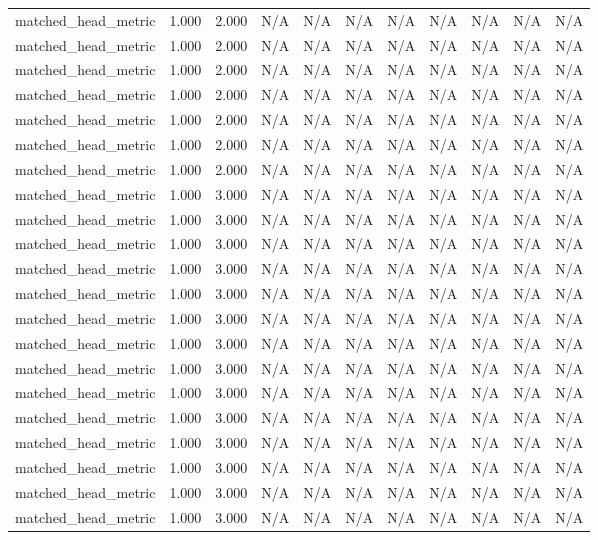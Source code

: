 \begin{table}[h!]
\begin{tabular}{lrrrrrrrrrr}
matched\_head\_metric & 1.000 & 2.000 & N/A & N/A & N/A & N/A & N/A & N/A & N/A & N/A \\
matched\_head\_metric & 1.000 & 2.000 & N/A & N/A & N/A & N/A & N/A & N/A & N/A & N/A \\
matched\_head\_metric & 1.000 & 2.000 & N/A & N/A & N/A & N/A & N/A & N/A & N/A & N/A \\
matched\_head\_metric & 1.000 & 2.000 & N/A & N/A & N/A & N/A & N/A & N/A & N/A & N/A \\
matched\_head\_metric & 1.000 & 2.000 & N/A & N/A & N/A & N/A & N/A & N/A & N/A & N/A \\
matched\_head\_metric & 1.000 & 2.000 & N/A & N/A & N/A & N/A & N/A & N/A & N/A & N/A \\
matched\_head\_metric & 1.000 & 2.000 & N/A & N/A & N/A & N/A & N/A & N/A & N/A & N/A \\
matched\_head\_metric & 1.000 & 3.000 & N/A & N/A & N/A & N/A & N/A & N/A & N/A & N/A \\
matched\_head\_metric & 1.000 & 3.000 & N/A & N/A & N/A & N/A & N/A & N/A & N/A & N/A \\
matched\_head\_metric & 1.000 & 3.000 & N/A & N/A & N/A & N/A & N/A & N/A & N/A & N/A \\
matched\_head\_metric & 1.000 & 3.000 & N/A & N/A & N/A & N/A & N/A & N/A & N/A & N/A \\
matched\_head\_metric & 1.000 & 3.000 & N/A & N/A & N/A & N/A & N/A & N/A & N/A & N/A \\
matched\_head\_metric & 1.000 & 3.000 & N/A & N/A & N/A & N/A & N/A & N/A & N/A & N/A \\
matched\_head\_metric & 1.000 & 3.000 & N/A & N/A & N/A & N/A & N/A & N/A & N/A & N/A \\
matched\_head\_metric & 1.000 & 3.000 & N/A & N/A & N/A & N/A & N/A & N/A & N/A & N/A \\
matched\_head\_metric & 1.000 & 3.000 & N/A & N/A & N/A & N/A & N/A & N/A & N/A & N/A \\
matched\_head\_metric & 1.000 & 3.000 & N/A & N/A & N/A & N/A & N/A & N/A & N/A & N/A \\
matched\_head\_metric & 1.000 & 3.000 & N/A & N/A & N/A & N/A & N/A & N/A & N/A & N/A \\
matched\_head\_metric & 1.000 & 3.000 & N/A & N/A & N/A & N/A & N/A & N/A & N/A & N/A \\
matched\_head\_metric & 1.000 & 3.000 & N/A & N/A & N/A & N/A & N/A & N/A & N/A & N/A \\
matched\_head\_metric & 1.000 & 3.000 & N/A & N/A & N/A & N/A & N/A & N/A & N/A & N/A \\

\end{tabular}
\end{table}
